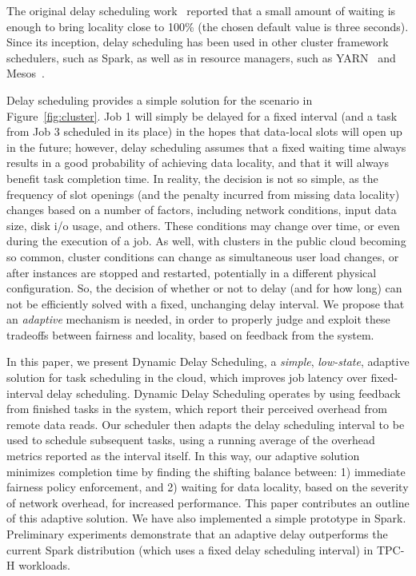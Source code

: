 The original delay scheduling work~\cite{Zaharia2010} reported that a small amount of waiting is enough
to bring locality close to 100\% (the chosen default value is three seconds). Since its 
inception, delay scheduling has been used in other cluster framework schedulers, such as 
Spark, as well as in resource managers, such as YARN~\cite{Vavilapalli2013} and
Mesos~\cite{Hindman2011}.

Delay scheduling provides a simple solution for the scenario in 
Figure~\ref{fig:cluster}. Job 1 will simply be delayed for a fixed interval (and a task
from Job 3 scheduled in its place) in the hopes that data-local slots will open up in 
the future; however, delay scheduling assumes that a fixed waiting time always results
in a good probability of achieving data locality, and that it will always benefit task completion time.
In reality, the decision is not so simple, as the frequency of slot openings (and the penalty
incurred from missing data locality) changes based on a number of factors, including
network conditions, input data size, disk i/o usage, and others. These
conditions may change over time, or even during the execution of a job. As well, with clusters
in the public cloud becoming so common, cluster conditions can change as simultaneous user
load changes, or after instances are stopped and restarted, potentially in a different physical
configuration. So, the
decision of whether or not to delay (and for how long) can not be efficiently solved with
a fixed, unchanging delay interval. We propose that an \emph{adaptive} mechanism is needed,
in order to properly judge and exploit these tradeoffs between fairness and locality,
based on feedback from the system.

In this paper, we present Dynamic Delay Scheduling, a \emph{simple}, \emph{low-state}, adaptive
solution for task scheduling in the cloud, which improves job latency over
fixed-interval delay scheduling. Dynamic Delay Scheduling operates by using feedback from finished
tasks in the system, which report their perceived overhead from remote data
reads. Our scheduler then adapts the delay scheduling interval to be used to schedule subsequent
tasks, using a running average of the overhead metrics reported as the interval
itself. In this way, our adaptive solution minimizes completion time by finding the shifting balance between:
1) immediate fairness policy enforcement, and 2) waiting for data locality, based on the severity of network overhead,
for increased performance.
This paper contributes an outline of this adaptive solution. We have
also implemented a simple prototype in Spark. Preliminary experiments demonstrate that
an adaptive delay outperforms the current Spark distribution (which uses a fixed delay
scheduling interval) in TPC-H workloads. 

